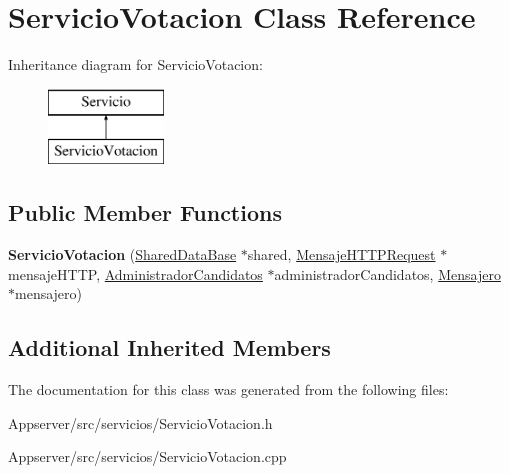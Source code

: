 \hypertarget{classServicioVotacion}{}\section{Servicio\+Votacion Class Reference}
\label{classServicioVotacion}
Inheritance diagram for Servicio\+Votacion\+:\begin{figure}[H]
\begin{center}
\leavevmode
\includegraphics[height=2.000000cm]{classServicioVotacion}
\end{center}
\end{figure}
\subsection*{Public Member Functions}
\begin{DoxyCompactItemize}
\item 
{\bfseries Servicio\+Votacion} (\hyperlink{classSharedDataBase}{Shared\+Data\+Base} $\ast$shared, \hyperlink{classMensajeHTTPRequest}{Mensaje\+H\+T\+T\+P\+Request} $\ast$mensaje\+H\+T\+TP, \hyperlink{classAdministradorCandidatos}{Administrador\+Candidatos} $\ast$administrador\+Candidatos, \hyperlink{classMensajero}{Mensajero} $\ast$mensajero)\hypertarget{classServicioVotacion_ac91e3935eb6e42e54a5110737c8da412}{}\label{classServicioVotacion_ac91e3935eb6e42e54a5110737c8da412}

\end{DoxyCompactItemize}
\subsection*{Additional Inherited Members}


The documentation for this class was generated from the following files\+:\begin{DoxyCompactItemize}
\item 
Appserver/src/servicios/Servicio\+Votacion.\+h\item 
Appserver/src/servicios/Servicio\+Votacion.\+cpp\end{DoxyCompactItemize}
